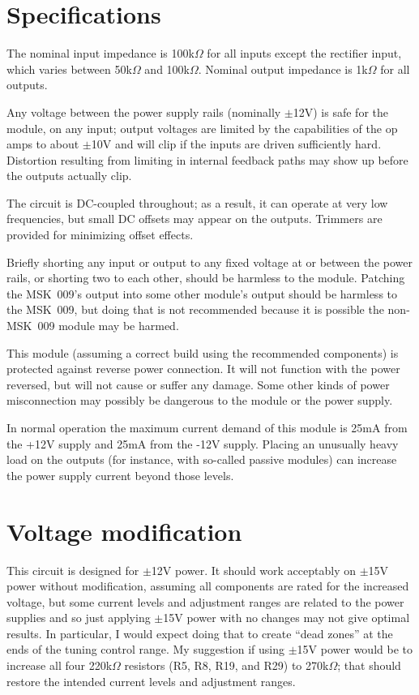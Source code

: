 \section{Specifications}

The nominal input impedance is 100k$\Omega$ for all inputs except the
rectifier input, which varies between 50k$\Omega$ and 100k$\Omega$.  Nominal
output impedance is 1k$\Omega$ for all outputs.

Any voltage between the power supply rails (nominally $\pm$12V) is safe for
the module, on any input; output voltages are limited by the capabilities of
the op amps to about $\pm$10V and will clip if the inputs are driven
sufficiently hard.  Distortion resulting from limiting in internal feedback
paths may show up before the outputs actually clip.

The circuit is DC-coupled throughout; as a result, it can operate at very
low frequencies, but small DC offsets may appear on the outputs.  Trimmers
are provided for minimizing offset effects.

Briefly shorting any input or output to any fixed voltage at or between the
power rails, or shorting two to each other, should be harmless to the
module.  Patching the MSK~009's output into some other module's output
should be harmless to the MSK~009, but doing that is not recommended because
it is possible the non-MSK~009 module may be harmed.

This module (assuming a correct build using the recommended components) is
protected against reverse power connection.  It will not function with the
power reversed, but will not cause or suffer any damage.  Some other kinds
of power misconnection may possibly be dangerous to the module or the power
supply.

In normal operation the maximum current demand of this module is 25mA from
the +12V supply and 25mA from the -12V supply.  Placing an unusually heavy
load on the outputs (for instance, with so-called passive modules) can
increase the power supply current beyond those levels.

\section{Voltage modification}

This circuit is designed for $\pm$12V power.  It should work acceptably on
$\pm$15V power without modification, assuming all components are rated for
the increased voltage, but some current levels and adjustment ranges are
related to the power supplies and so just applying $\pm$15V power with no
changes may not give optimal results.  In particular, I would expect doing
that to create ``dead zones'' at the ends of the tuning control range.  My
suggestion if using $\pm$15V power would be to increase all four
220k$\Omega$ resistors (R5, R8, R19, and R29) to 270k$\Omega$; that should
restore the intended current levels and adjustment ranges.

